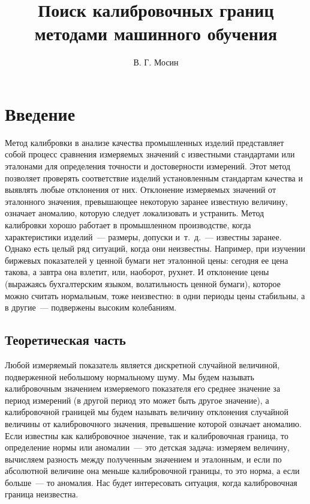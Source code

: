 \documentclass[a4paper,12pt]{article}
\title{Поиск калибровочных границ методами машинного обучения}
\author{В. Г. Мосин}
\date{}
\begin{document}
	\maketitle
	
\tableofcontents
	
\section{Введение}
Метод калибровки в анализе качества промышленных изделий представляет собой процесс сравнения измеряемых значений с известными стандартами или эталонами для определения точности и достоверности измерений. Этот метод позволяет проверять соответствие изделий установленным стандартам качества и выявлять любые отклонения от них. Отклонение измеряемых значений от эталонного значения, превышающее некоторую заранее известную величину, означает аномалию, которую следует локализовать и устранить. Метод калибровки хорошо работает в промышленном производстве, когда характеристики изделий — размеры, допуски и т. д. — известны заранее. 
Однако есть целый ряд ситуаций, когда они неизвестны. Например, при изучении биржевых показателей у ценной бумаги нет эталонной цены: сегодня ее цена такова, а завтра она взлетит, или, наоборот, рухнет. И отклонение цены (выражаясь бухгалтерским языком, волатильность ценной бумаги), которое можно считать нормальным, тоже неизвестно: в одни периоды цены стабильны, а в другие — подвержены высоким колебаниям.


\subsection{Теоретическая часть}


Любой измеряемый показатель является дискретной случайной величиной, подверженной небольшому нормальному шуму. Мы будем называть калибровочным значением измеряемого показателя его среднее значение за период измерений (в другой период это может быть другое значение), а калибровочной границей мы будем называть величину отклонения случайной величины от калибровочного значения, превышение которой означает аномалию.
Если известны как калибровочное значение, так и калибровочная граница, то определение нормы или аномалии — это детская задача: измеряем величину, вычисляем разность между полученным значением и эталонным, и если по абсолютной величине она меньше калибровочной границы, то это норма, а если больше — то аномалия.
Нас будет интересовать ситуация, когда калибровочная граница неизвестна.
\end{document}

